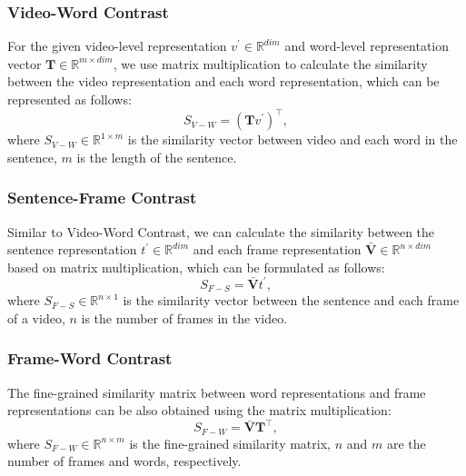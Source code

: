 \documentclass[sigconf]{acmart}
\begin{document}
\subsubsection{Video-Word Contrast} \label{sec:video_word}

For the given video-level representation $v^{\prime} \in \mathbb{R}^{dim}$ and word-level representation vector $\mathbf{T}  \in \mathbb{R}^{m \times dim}$, we use matrix multiplication to calculate the similarity between the video representation and each word representation, which can be represented as follows:
\begin{equation}
    S_{V-W}=(\mathbf{T} v^{\prime})^\intercal,
\label{eq:video_word_simi}
\end{equation}
where $S_{V-W} \in \mathbb{R}^{1 \times m}$ is the similarity vector between video and each word in the sentence, $m$ is the length of the sentence.

\subsubsection{Sentence-Frame Contrast} \label{sec:frame_sentence}

Similar to Video-Word Contrast, we can calculate the similarity between the sentence representation $t^{\prime} \in \mathbb{R}^{dim}$ and each frame representation $\bar{\mathbf{V}}  \in \mathbb{R}^{n \times dim}$ based on matrix multiplication, which can be formulated as follows:
\begin{equation}
    S_{F-S}=\bar{\mathbf{V}}   t^{\prime},
\label{eq:frame_sentence_simi}
\end{equation}
where $S_{F-S} \in \mathbb{R}^{n \times 1}$ is the similarity vector between the sentence and each frame of a video, $n$ is the number of frames in the video.

\subsubsection{Frame-Word Contrast} \label{sec:frame_word}

The fine-grained similarity matrix between word representations and frame representations can be also obtained using the matrix multiplication:
\begin{equation}
    S_{F-W}=\bar{\mathbf{V}}   \mathbf{T}^\intercal,
\label{eq:frame_word_simi}
\end{equation}
where $S_{F-W} \in \mathbb{R}^{n \times m}$ is the fine-grained similarity matrix, $n$ and $m$ are the number of frames and words, respectively.
\end{document}
